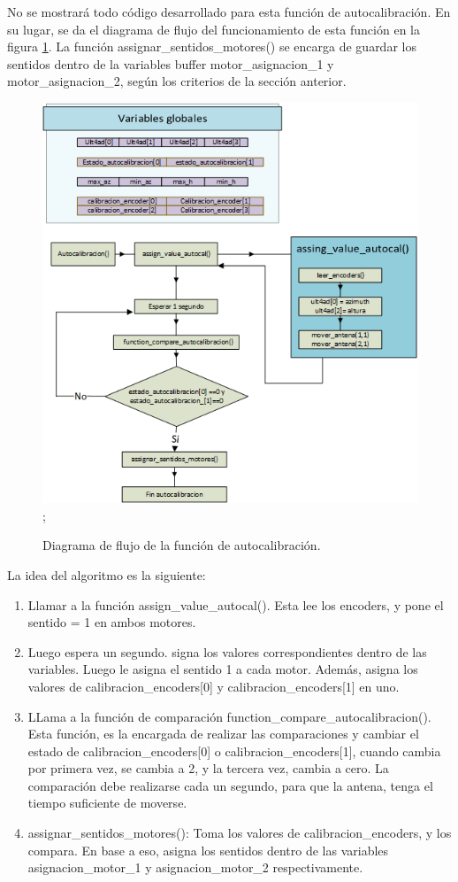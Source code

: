 No se mostrará todo código desarrollado para esta función de autocalibración. En su lugar, se da el diagrama de flujo del funcionamiento de esta función en la figura \ref{fig:flujo_autocalibracion}. La función assignar\_sentidos\_motores() se encarga de guardar los sentidos dentro de la variables buffer motor\_asignacion\_1 y motor\_asignacion\_2, según los criterios de la sección anterior. 
\begin{figure}[ht]
	\centering
	\includegraphics{flujo_autocal} ; 
	\caption{Diagrama de flujo de la función de autocalibración.}
	\label{fig:flujo_autocalibracion}
\end{figure}

La idea del algoritmo es la siguiente: 
\begin{enumerate}
	\item Llamar a la función assign\_value\_autocal(). Esta lee los encoders, y pone el sentido = 1 en ambos motores. 
	\item Luego espera un segundo. signa los valores correspondientes dentro de las variables. Luego le asigna el sentido 1 a cada motor. Además, asigna los valores de calibracion\_encoders[0] y  calibracion\_encoders[1] en uno. 
	\item LLama a la función de comparación function\_compare\_autocalibracion(). Esta función, es la encargada de realizar las comparaciones y cambiar el estado de calibracion\_encoders[0] o calibracion\_encoders[1], cuando cambia por primera vez, se cambia a 2, y la tercera vez, cambia a cero. La comparación debe realizarse cada un segundo, para que la antena, tenga el tiempo suficiente de moverse.  
	\item assignar\_sentidos\_motores(): Toma los valores de calibracion\_encoders, y los compara. En base a eso, asigna los sentidos dentro de las variables asignacion\_motor\_1 y asignacion\_motor\_2 respectivamente. 
\end{enumerate}


